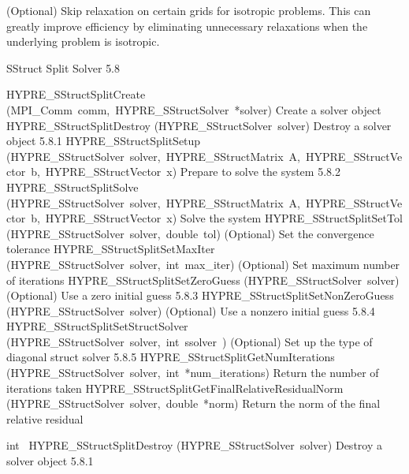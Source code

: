 \documentclass{article}
\begin{document}
\begin{cxxentry}
\begin{cxxentry}
\begin{cxxfunction}
\begin{cxxdoc}
(Optional) Skip relaxation on certain grids for isotropic problems.  This can
greatly improve efficiency by eliminating unnecessary relaxations when the
underlying problem is isotropic.
\end{cxxdoc}
\end{cxxfunction}
\end{cxxentry}
\begin{cxxentry}
{}
        {SStruct Split Solver}
        {}
        {
}
        {5.8}
\begin{cxxnames}
        {HYPRE\_SStructSplitCreate}
        {(MPI\_Comm\ comm,\ HYPRE\_SStructSolver\ *solver)}
        {
Create a solver object}
        {}
\label{cxx.5.8.6}
        {HYPRE\_SStructSplitDestroy}
        {(HYPRE\_SStructSolver\ solver)}
        {
Destroy a solver object}
        {5.8.1}
        {HYPRE\_SStructSplitSetup}
        {(HYPRE\_SStructSolver\ solver,\ HYPRE\_SStructMatrix\ A,\ HYPRE\_SStructVector\ b,\ HYPRE\_SStructVector\ x)}
        {
Prepare to solve the system}
        {5.8.2}
        {HYPRE\_SStructSplitSolve}
        {(HYPRE\_SStructSolver\ solver,\ HYPRE\_SStructMatrix\ A,\ HYPRE\_SStructVector\ b,\ HYPRE\_SStructVector\ x)}
        {
Solve the system}
        {}
\label{cxx.5.8.7}
        {HYPRE\_SStructSplitSetTol}
        {(HYPRE\_SStructSolver\ solver,\ double\ tol)}
        {
(Optional) Set the convergence tolerance}
        {}
\label{cxx.5.8.8}
        {HYPRE\_SStructSplitSetMaxIter}
        {(HYPRE\_SStructSolver\ solver,\ int\ max\_iter)}
        {
(Optional) Set maximum number of iterations}
        {}
\label{cxx.5.8.9}
        {HYPRE\_SStructSplitSetZeroGuess}
        {(HYPRE\_SStructSolver\ solver)}
        {
(Optional) Use a zero initial guess}
        {5.8.3}
        {HYPRE\_SStructSplitSetNonZeroGuess}
        {(HYPRE\_SStructSolver\ solver)}
        {
(Optional) Use a nonzero initial guess}
        {5.8.4}
        {HYPRE\_SStructSplitSetStructSolver}
        {(HYPRE\_SStructSolver\ solver,\ int\ ssolver\ )}
        {
(Optional) Set up the type of diagonal struct solver}
        {5.8.5}
        {HYPRE\_SStructSplitGetNumIterations}
        {(HYPRE\_SStructSolver\ solver,\ int\ *num\_iterations)}
        {
Return the number of iterations taken}
        {}
\label{cxx.5.8.10}
        {HYPRE\_SStructSplitGetFinalRelativeResidualNorm}
        {(HYPRE\_SStructSolver\ solver,\ double\ *norm)}
        {
Return the norm of the final relative residual}
        {}
\label{cxx.5.8.11}
\end{cxxnames}
\begin{cxxfunction}
{int\ }
        {HYPRE\_SStructSplitDestroy}
        {(HYPRE\_SStructSolver\ solver)}
        {
Destroy a solver object}
        {5.8.1}
\begin{cxxdoc}


\end{cxxdoc}
\end{cxxfunction}
\end{cxxentry}
\end{cxxentry}
\end{document}

